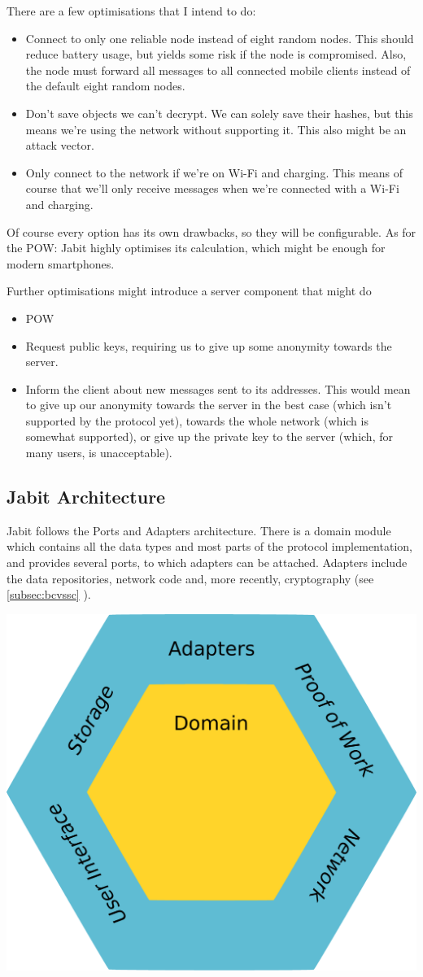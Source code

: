\documentclass{bfh}
\begin{document}
  There are a few optimisations that I intend to do:
  \begin{itemize}
    \item Connect to only one reliable node instead of eight random nodes. This should reduce battery usage, but yields some risk if the node is compromised. Also, the node must forward all messages to all connected mobile clients instead of the default eight random nodes.
    \item Don't save objects we can't decrypt. We can solely save their hashes, but this means we're using the network without supporting it. This also might be an attack vector.
    \item Only connect to the network if we're on Wi-Fi and charging. This means of course that we'll only receive messages when we're connected with a Wi-Fi and charging.
  \end{itemize}
  Of course every option has its own drawbacks, so they will be configurable. As for the \ac{POW}: Jabit highly optimises its calculation, which might be enough for modern smartphones.

  Further optimisations might introduce a server component that might do
  \begin{itemize}
    \item \acl{POW}
    \item Request public keys, requiring us to give up some anonymity towards the server.
    \item Inform the client about new messages sent to its addresses. This would mean to give up our anonymity towards the server in the best case (which isn't supported by the protocol yet), towards the whole network (which is somewhat supported), or give up the private key to the server (which, for many users, is unacceptable).
  \end{itemize}

  \subsection{Jabit Architecture}
  Jabit follows the Ports and Adapters architecture. There is a domain module which contains all the data types and most parts of the protocol implementation, and provides several ports, to which adapters can be attached. Adapters include the data repositories, network code and, more recently, cryptography (see \ref{subsec:bcvssc} ).

  \begin{center}
    \includegraphics[width=0.5 \textwidth]{images/ports_and_adapters.pdf}
  \end{center}
\end{document}
